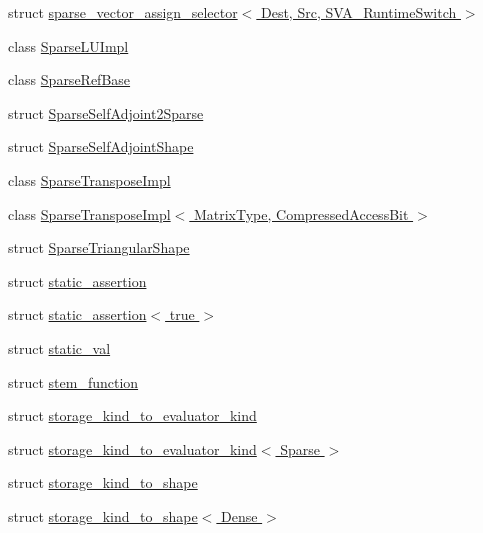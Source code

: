 \begin{DoxyCompactItemize}
\item 
struct \hyperlink{struct_eigen_1_1internal_1_1sparse__vector__assign__selector_3_01_dest_00_01_src_00_01_s_v_a___runtime_switch_01_4}{sparse\+\_\+vector\+\_\+assign\+\_\+selector$<$ Dest, Src, S\+V\+A\+\_\+\+Runtime\+Switch $>$}
\item 
class \hyperlink{group___sparse_l_u___module_class_eigen_1_1internal_1_1_sparse_l_u_impl}{Sparse\+L\+U\+Impl}
\item 
class \hyperlink{class_eigen_1_1internal_1_1_sparse_ref_base}{Sparse\+Ref\+Base}
\item 
struct \hyperlink{struct_eigen_1_1internal_1_1_sparse_self_adjoint2_sparse}{Sparse\+Self\+Adjoint2\+Sparse}
\item 
struct \hyperlink{struct_eigen_1_1internal_1_1_sparse_self_adjoint_shape}{Sparse\+Self\+Adjoint\+Shape}
\item 
class \hyperlink{class_eigen_1_1internal_1_1_sparse_transpose_impl}{Sparse\+Transpose\+Impl}
\item 
class \hyperlink{class_eigen_1_1internal_1_1_sparse_transpose_impl_3_01_matrix_type_00_01_compressed_access_bit_01_4}{Sparse\+Transpose\+Impl$<$ Matrix\+Type, Compressed\+Access\+Bit $>$}
\item 
struct \hyperlink{struct_eigen_1_1internal_1_1_sparse_triangular_shape}{Sparse\+Triangular\+Shape}
\item 
struct \hyperlink{struct_eigen_1_1internal_1_1static__assertion}{static\+\_\+assertion}
\item 
struct \hyperlink{struct_eigen_1_1internal_1_1static__assertion_3_01true_01_4}{static\+\_\+assertion$<$ true $>$}
\item 
struct \hyperlink{struct_eigen_1_1internal_1_1static__val}{static\+\_\+val}
\item 
struct \hyperlink{struct_eigen_1_1internal_1_1stem__function}{stem\+\_\+function}
\item 
struct \hyperlink{struct_eigen_1_1internal_1_1storage__kind__to__evaluator__kind}{storage\+\_\+kind\+\_\+to\+\_\+evaluator\+\_\+kind}
\item 
struct \hyperlink{struct_eigen_1_1internal_1_1storage__kind__to__evaluator__kind_3_01_sparse_01_4}{storage\+\_\+kind\+\_\+to\+\_\+evaluator\+\_\+kind$<$ Sparse $>$}
\item 
struct \hyperlink{struct_eigen_1_1internal_1_1storage__kind__to__shape}{storage\+\_\+kind\+\_\+to\+\_\+shape}
\item 
struct \hyperlink{struct_eigen_1_1internal_1_1storage__kind__to__shape_3_01_dense_01_4}{storage\+\_\+kind\+\_\+to\+\_\+shape$<$ Dense $>$}

\end{DoxyCompactItemize}
